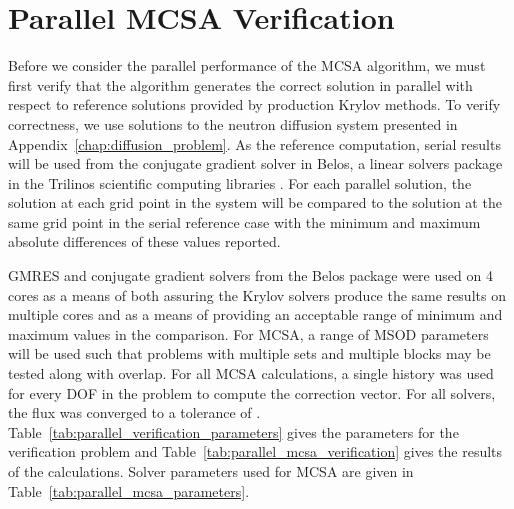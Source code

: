 \section{Parallel MCSA Verification\ }
\label{sec:parallel_verification}
Before we consider the parallel performance of the MCSA algorithm, we
must first verify that the algorithm generates the correct solution in
parallel with respect to reference solutions provided by production
Krylov methods. To verify correctness, we use solutions to the neutron
diffusion system presented in
Appendix~\ref{chap:diffusion_problem}. As the reference computation,
serial results will be used from the conjugate gradient solver in
Belos, a linear solvers package in the Trilinos scientific computing
libraries \cite{heroux_overview_2005}. For each parallel solution, the
solution at each grid point in the system will be compared to the
solution at the same grid point in the serial reference case with the
minimum and maximum absolute differences of these values reported.

GMRES and conjugate gradient solvers from the Belos package were used
on 4 cores as a means of both assuring the Krylov solvers produce the
same results on multiple cores and as a means of providing an
acceptable range of minimum and maximum values in the comparison. For
MCSA, a range of MSOD parameters will be used such that problems with
multiple sets and multiple blocks may be tested along with
overlap. For all MCSA calculations, a single history was used for
every DOF in the problem to compute the correction vector. For all
solvers, the flux was converged to a tolerance of
. Table~\ref{tab:parallel_verification_parameters} gives the
parameters for the verification problem and
Table~\ref{tab:parallel_mcsa_verification} gives the results of the
calculations. Solver parameters used for MCSA are given in
Table~\ref{tab:parallel_mcsa_parameters}.

